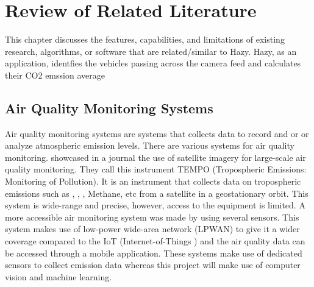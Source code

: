 \chapter{Review of Related Literature}
\label{sec:relatedlit}

This chapter discusses the features, capabilities, and limitations of existing research, algorithms, or software  that are related/similar to Hazy. Hazy, as an application, identfies the vehicles passing across the camera feed and calculates their CO2 emssion average


\begin{comment}
%
%
Guide on Writing your RRL chapter
 
1. Identify the keywords with respect to your research
      One keyword = One document section
                Examples: 2.1 Story Generation Systems
			 2.2 Knowledge Representation

2.  Find references using these keywords

3.  For each of the references that you find,
        Check: Is it relevant to your research?
        Use their references to find more relevant works.

4. Identify a set of criteria for comparison.
       It will serve as a guide to help you focus on what to look for

5. Write a summary focusing on -
       What: A short description of the work
       How: A summary of the approach it utilized
       Findings: If applicable, provide the results
        Why: Relevance to your work

6. At the end of each section,  show a Table of Comparison of the related works 
   and your proposed project/system

\end{comment}

\section{Air Quality Monitoring Systems}
Air quality monitoring systems are systems that collects data to record and or or analyze atmospheric emission levels. There are various systems for air quality monitoring. \cite{zoogman_2017} showcased in a journal the use of satellite imagery for large-scale air quality monitoring. They call this instrument TEMPO (Tropospheric Emissions: Monitoring of Pollution). It is an instrument that collects data on tropospheric emissions such as , , , Methane, etc from a satellite in a geostationary orbit. This system is wide-range and precise,  however, access to the equipment is limited.  A more accessible air monitoring system was made by \cite{zheng_2016} using several sensors. This system makes use of low-power wide-area network (LPWAN) to give it a wider coverage compared to the IoT (Internet-of-Things ) and the air quality data can be accessed through a mobile application. These systems make use of dedicated sensors to collect emission data whereas this project will make use of computer vision and machine learning.



